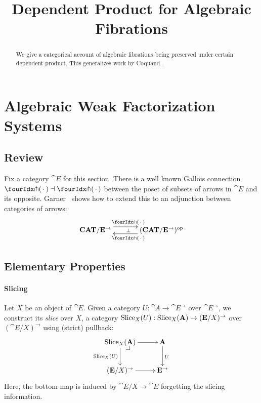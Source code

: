 \documentclass[reqno,10pt,a4paper,oneside]{amsart}
\title{Dependent Product for Algebraic Fibrations}
\begin{document}
\begin{abstract}
We give a categorical account of algebraic fibrations being preserved under certain dependent product.
This generalizes work by Coquand \etal.
\end{abstract}

\maketitle

\tableofcontents

\section{Algebraic Weak Factorization Systems}

\subsection{Review}

Fix a category $\cat{E}$ for this section.
There is a well known Gallois connection $\liftr{\brarghole} \dashv \liftl{\brarghole}$ between the poset of subsets of arrows in $\cat{E}$ and its opposite.
Garner~\cite{garner:small-object-argument} shows how to extend this to an adjunction between categories of arrows:
\begin{equation}
\label{garner-adjunction}
\begin{gathered}
\xymatrix@C+1em{
  \CAT/\cat{E}^{\to}
  \ar@<5pt>[r]^{\liftl{\brarghole}}
  \ar@{}[r]|{\bot}
&
  (\CAT/\cat{E}^{\to})^{\op}
  \ar@<5pt>[l]^{\liftr{\brarghole}}
}
\end{gathered}
\end{equation}

\subsection{Elementary Properties}

\paragraph{Slicing}

Let $X$ be an object of $\cat{E}$.
Given a category $U : \cat{A} \to \cat{E}^{\to}$ over $\cat{E}^{\to}$, we construct its \emph{slice} over $X$, a category $\operatorname{Slice}_X(U) : \operatorname{Slice}_X(\mathbf{A}) \to (\mathbf{E}/X)^{\to}$ over $(\cat{E}/X)^{\to}$ using (strict) pullback:
\[
\xymatrix{
  \Slice_X(\cat{A})
  \ar[r]
  \ar[d]_{\Slice_X(U)}
  \pullback{dr}
&
  \cat{A}
  \ar[d]^{U}
\\
  (\cat{E}/X)^{\to}
  \ar[r]
&
  \cat{E}^{\to}
}
\]
Here, the bottom map is induced by $\cat{E}/X \to \cat{E}$ forgetting the slicing information.
\end{document}
